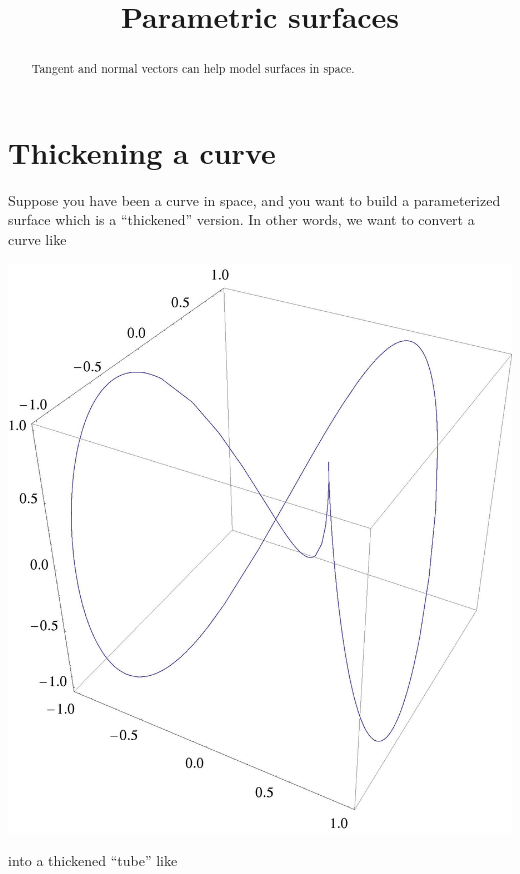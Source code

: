 \documentclass{ximera}
\title[Dig-In:]{Parametric surfaces}
\begin{document}
\begin{abstract}
  Tangent and normal vectors can help model surfaces in space.
\end{abstract}
\maketitle


\section{Thickening a curve}

Suppose you have been a curve in space, and you want to build a
parameterized surface which is a ``thickened'' version.  In other
words, we want to convert a curve like
\begin{image}
  \includegraphics{curve.jpg}
\end{image}
into a thickened ``tube'' like
\end{document}
